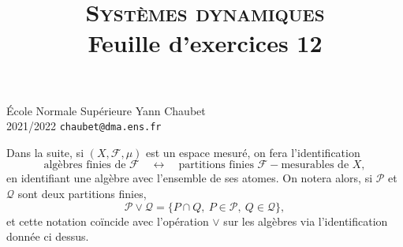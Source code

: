 \documentclass[a4paper,12pt,openany]{article}
\title{\textsc{Syst\`emes dynamiques} \\ Feuille d'exercices 12}
\date{}
\author{}
\theoremstyle{plain}
\theoremstyle{definition}
\newcommand{\Pcal}{\mathcal{P}}
\newcommand{\Fcal}{\mathcal{F}}
\newcommand{\Qcal}{\mathcal{Q}}
\begin{document}
{\noindent \'Ecole Normale Sup\'erieure  \hfill Yann Chaubet } \\
{2021/2022 \hfill \texttt{chaubet@dma.ens.fr}}

{\let\newpage\relax\maketitle}
\maketitle


Dans la suite, si $(X, \Fcal, \mu)$ est un espace mesur\'e, on fera l'identification 
$$
\textrm{alg\`ebres finies de }\Fcal \quad \longleftrightarrow \quad \textrm{partitions finies } \Fcal-\text{mesurables de } X,
$$
en identifiant une alg\`ebre avec l'ensemble de ses atomes. On notera alors, si $\Pcal$ et $\Qcal$ sont deux partitions finies,
$$
\Pcal \vee \Qcal = \{P \cap Q,~P \in \Pcal,~Q\in \Qcal\},
$$
et cette notation co\"incide avec l'op\'eration $\vee$ sur les alg\`ebres via l'identification donn\'ee ci dessus.

\vspace{1cm}


 \vspace{1.5mm} 
\end{document}
